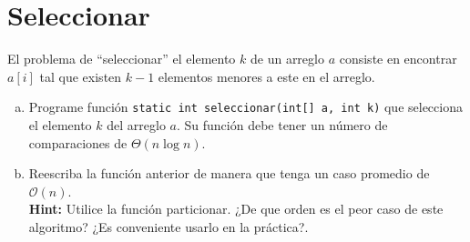 \documentclass[dcc,sol]{fcfmcourse}
\begin{document}
\section*{Seleccionar}
\begin{problems}
\problem El problema de ``seleccionar'' el elemento $k$ de un arreglo $a$ consiste en encontrar $a[i]$ tal que existen $k-1$ elementos menores a este en el arreglo.
\begin{enumerate} [a)]
    \item Programe función \texttt{static int seleccionar(int[] a, int k)} que selecciona el elemento $k$ del arreglo $a$. Su función debe tener un número de comparaciones de $\Theta (n \log n)$.
    \item Reescriba la función anterior de manera que tenga un caso promedio de $\mathcal{O}(n)$.
    \\ \textbf{Hint:} Utilice la función particionar. ¿De que orden es el peor caso de este algoritmo? ¿Es conveniente usarlo en la práctica?.
\end{enumerate}

\end{problems}
\end{document}

